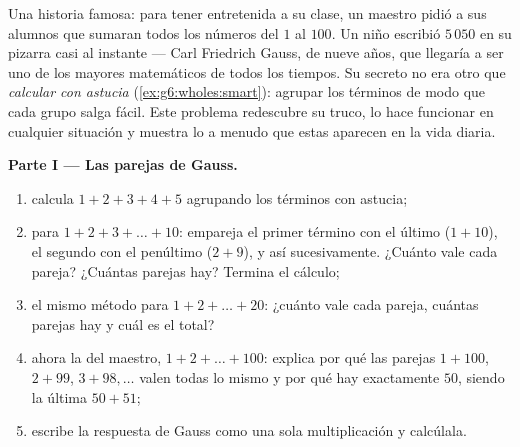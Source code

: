 \begin{problem}
\label{pb:g6:wholes:1}
Una historia famosa: para tener entretenida a su clase, un maestro pidió a sus
alumnos que sumaran todos los números del $1$ al $100$. Un niño escribió
$5\,050$ en su pizarra casi al instante --- Carl Friedrich Gauss, de nueve
años, que llegaría a ser uno de los mayores matemáticos
de todos los tiempos. Su secreto no era otro que \emph{calcular con astucia}
(\cref{ex:g6:wholes:smart}): agrupar los términos de modo que cada grupo
salga fácil. Este problema redescubre su truco, lo hace funcionar en cualquier
situación y muestra lo a menudo que estas  aparecen en la vida diaria.

\medskip
\noindent\textbf{Parte I --- Las parejas de Gauss.}
\begin{enumerate}
  \item calcula $1 + 2 + 3 + 4 + 5$ agrupando los términos con astucia;
  \item para $1 + 2 + 3 + \dots + 10$: empareja el primer término con el
        último ($1 + 10$), el segundo con el penúltimo
        ($2 + 9$), y así sucesivamente. ¿Cuánto vale cada pareja? ¿Cuántas
        parejas hay? Termina el cálculo;
  \item el mismo método para $1 + 2 + \dots + 20$: ¿cuánto vale cada pareja,
        cuántas parejas hay y cuál es el total?
  \item ahora la  del maestro, $1 + 2 + \dots + 100$: explica
        por qué las parejas $1 + 100$, $2 + 99$, $3 + 98, \dots$ valen
        todas lo mismo y por qué hay exactamente $50$,
        siendo la última $50 + 51$;
  \item escribe la respuesta de Gauss como una sola multiplicación y
        calcúlala.
\end{enumerate}


\end{problem}
